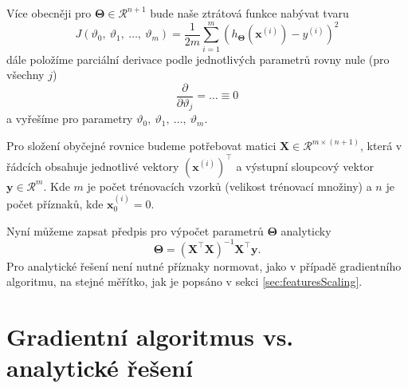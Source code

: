 {\par{Více obecněji pro $\bm{\Theta} \in \mathcal{R}^{n+1}$ bude naše ztrátová funkce nabývat tvaru
\begin{equation}
	J \left( \vartheta_0,~\vartheta_1,~\ldots,~\vartheta_m \right) = \frac{1}{2m} \sum_{i=1}^{m} \left( h_{\bm{\Theta}} \left( \bm{x}^{\left( i \right)} \right) - y^{\left( i \right)} \right)^2
\end{equation}
dále položíme parciální derivace podle jednotlivých parametrů rovny nule (pro všechny $j$)
\begin{equation}
	\frac{\partial}{\partial \vartheta_j} = \ldots \equiv 0
\end{equation}
a vyřešíme pro parametry $\vartheta_0,~\vartheta_1,~\ldots,~\vartheta_m$.}

\par{Pro složení obyčejné rovnice budeme potřebovat matici $\bm{X} \in \mathcal{R}^{m \times \left( n + 1 \right)}$, která v řádcích obsahuje jednotlivé vektory $\left( \bm{x}^{\left( i \right)} \right)^{\top}$ a výstupní sloupcový vektor $\bm{y} \in \mathcal{R}^{m}$. Kde $m$ je počet trénovacích vzorků (velikost trénovací množiny) a $n$ je počet příznaků, kde $\bm{x}_0^{\left( i \right)} = 0$.}

\par{Nyní můžeme zapsat předpis pro výpočet parametrů $\bm{\Theta}$ analyticky
\begin{equation}
	\bm{\Theta} = \left( \bm{X}^{\top} \bm{X} \right)^{-1} \bm{X}^{\top} \bm{y}.
\end{equation}
Pro analytické řešení není nutné příznaky normovat, jako v případě gradientního algoritmu, na stejné měřítko, jak je popsáno v sekci \ref{sec:featuresScaling}.}

\newpage




















\section{Gradientní algoritmus vs. analytické řešení}
\label{sec:GAvsAR}

}

